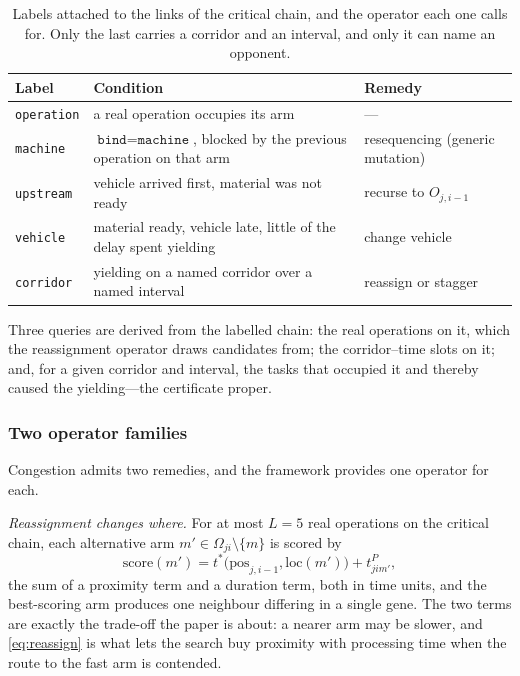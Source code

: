 \documentclass[manuscript,screen,review]{acmart}
\begin{document}
\begin{table}[t]
\caption{Labels attached to the links of the critical chain, and the operator
each one calls for. Only the last carries a corridor and an interval, and only
it can name an opponent.}
\label{tab:attrib}
\footnotesize
\begin{tabular}{@{}llp{2.55cm}@{}}
\toprule
Label & Condition & Remedy \\
\midrule
\texttt{operation} & a real operation occupies its arm & --- \\
\texttt{machine} & $\texttt{bind}=\texttt{machine}$, blocked by the previous
  operation on that arm & resequencing (generic mutation) \\
\texttt{upstream} & vehicle arrived first, material was not ready & recurse to
  $O_{j,i-1}$ \\
\texttt{vehicle} & material ready, vehicle late, little of the delay spent
  yielding & change vehicle \\
\texttt{corridor} & yielding on a named corridor over a named interval
  & reassign or stagger \\
\bottomrule
\end{tabular}
\end{table}

Three queries are derived from the labelled chain: the real operations on it,
which the reassignment operator draws candidates from; the corridor--time slots
on it; and, for a given corridor and interval, the tasks that occupied it and
thereby caused the yielding---the certificate proper.

\subsubsection{Two operator families}
Congestion admits two remedies, and the framework provides one operator for
each.

\emph{Reassignment changes where.} For at most $L=5$ real operations on the
critical chain, each alternative arm $m'\in\Omega_{ji}\setminus\{m\}$ is scored
by
\begin{equation}
\label{eq:reassign}
\mathrm{score}(m')=t^{*}\bigl(\mathrm{pos}_{j,i-1},\mathrm{loc}(m')\bigr)
+t^{P}_{jim'},
\end{equation}
the sum of a proximity term and a duration term, both in time units, and the
best-scoring arm produces one neighbour differing in a single gene. The two
terms are exactly the trade-off the paper is about: a nearer arm may be slower,
and \eqref{eq:reassign} is what lets the search buy proximity with processing
time when the route to the fast arm is contended.
\end{document}
